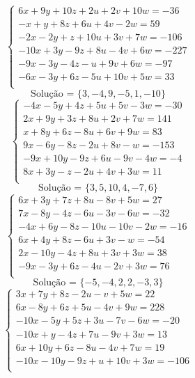 \documentclass[12pt,oneside,a4paper]{article}
\begin{document}
\vspace{\baselineskip}
\begin{equation*}
\begin{cases}
6x+9y+10z+2u+2v+10w=-36 \\
-x+y+8z+6u+4v-2w=59 \\
-2x-2y+z+10u+3v+7w=-106 \\
-10x+3y-9z+8u-4v+6w=-227 \\
-9x-3y-4z-u+9v+6w=-97 \\
-6x-3y+6z-5u+10v+5w=33 \\
\end{cases}
\end{equation*}
\begin{equation*}
\text{Solução = }\{3,-4,9,-5,1,-10\}
\end{equation*}
\vspace{\baselineskip}
\begin{equation*}
\begin{cases}
-4x-5y+4z+5u+5v-3w=-30 \\
2x+9y+3z+8u+2v+7w=141 \\
x+8y+6z-8u+6v+9w=83 \\
9x-6y-8z-2u+8v-w=-153 \\
-9x+10y-9z+6u-9v-4w=-4 \\
8x+3y-z-2u+4v+3w=11 \\
\end{cases}
\end{equation*}
\begin{equation*}
\text{Solução = }\{3,5,10,4,-7,6\}
\end{equation*}
\vspace{\baselineskip}
\begin{equation*}
\begin{cases}
6x+3y+7z+8u-8v+5w=27 \\
7x-8y-4z-6u-3v-6w=-32 \\
-4x+6y-8z-10u-10v-2w=-16 \\
6x+4y+8z-6u+3v-w=-54 \\
2x-10y-4z+8u+3v+3w=38 \\
-9x-3y+6z-4u-2v+3w=76 \\
\end{cases}
\end{equation*}
\begin{equation*}
\text{Solução = }\{-5,-4,2,2,-3,3\}
\end{equation*}
\vspace{\baselineskip}
\begin{equation*}
\begin{cases}
3x+7y+8z-2u-v+5w=22 \\
6x-8y+6z+5u-4v+9w=228 \\
-10x-5y+5z+3u-7v-6w=-20 \\
-10x+y-4z+7u-9v+3w=13 \\
6x+10y+6z-8u-4v+7w=19 \\
-10x-10y-9z+u+10v+3w=-106 \\
\end{cases}
\end{equation*}
\end{document}
